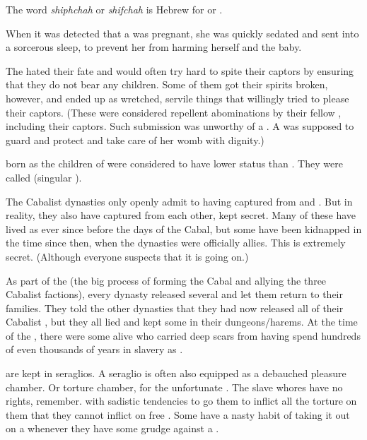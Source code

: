 The word \emph{shiphchah} or \emph{shifchah} is Hebrew for  or . 

When it was detected that a \yurid{} was pregnant, she was quickly sedated and sent into a sorcerous sleep, to prevent her from harming herself and the baby. 

The \yurideth{} hated their fate and would often try hard to spite their captors by ensuring that they do not bear any children. Some of them got their spirits broken, however, and ended up as wretched, servile things that willingly tried to please their captors. 
(These were considered repellent abominations by their fellow \resphain{}, including their captors. Such submission was unworthy of a \resvil{}. A \resvil{} was supposed to guard and protect and take care of her womb with dignity.)

\Resphain{} born as the children of \yurideth{} were considered to have lower status than \thelyadeth. They were called  (singular ). 

The Cabalist dynasties only openly admit to having \yurideth{} captured from \Kezerad{} and \Baelzerach. 
But in reality, they also have \yurideth{} captured from each other, kept secret. 
Many of these have lived as \yurideth{} ever since before the days of the Cabal, but some have been kidnapped in the time since then, when the dynasties were officially allies. This is extremely secret. 
(Although everyone suspects that it is going on.)

As part of the  (the big process of forming the Cabal and allying the three Cabalist factions), every dynasty released several \yurideth{} and let them return to their families. They told the other dynasties that they had now released all of their Cabalist \yurideth{}, but they all lied and kept some in their dungeons/harems.
At the time of the \thirdbanewar, there were some \resviel{} alive who carried deep scars from having spend hundreds of even thousands of years in slavery as \yurideth{}.

\Yurideth{} are kept in seraglios. A seraglio is often also equipped as a debauched pleasure chamber. Or torture chamber, for the unfortunate \yurid{}. The slave whores have no rights, remember. \Resphain{} with sadistic tendencies to go them to inflict all the torture on them that they cannot inflict on free \resviel{}. Some \resphain{} have a nasty habit of taking it out on a \yurid{} whenever they have some grudge against a \resvil{}.

